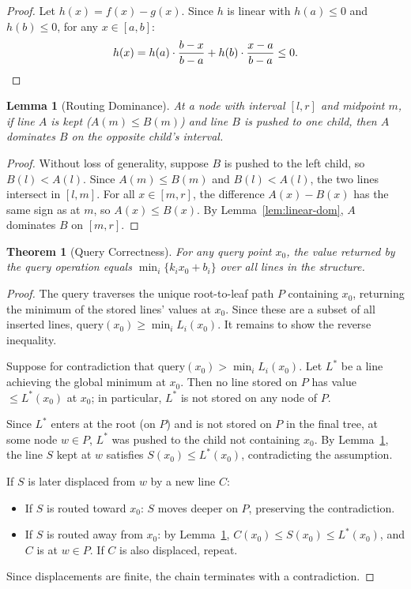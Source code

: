 \documentclass[11pt,a4paper]{article}
\theoremstyle{definition}
\theoremstyle{plain}
\newtheorem{lemma}{Lemma}
\newtheorem{theorem}{Theorem}
\begin{document}
\begin{proof}
Let $h(x) = f(x) - g(x)$. Since $h$ is linear with $h(a) \leq 0$ and $h(b) \leq 0$, for any $x \in [a, b]$:
\[
h(x) = h(a) \cdot \frac{b - x}{b - a} + h(b) \cdot \frac{x - a}{b - a} \leq 0. \qedhere
\]
\end{proof}

\begin{lemma}[Routing Dominance]\label{lem:routing-dom}
At a node with interval $[l, r]$ and midpoint $m$, if line $A$ is kept ($A(m) \leq B(m)$) and line $B$ is pushed to one child, then $A$ dominates $B$ on the opposite child's interval.
\end{lemma}

\begin{proof}
Without loss of generality, suppose $B$ is pushed to the left child, so $B(l) < A(l)$. Since $A(m) \leq B(m)$ and $B(l) < A(l)$, the two lines intersect in $[l, m]$. For all $x \in [m, r]$, the difference $A(x) - B(x)$ has the same sign as at $m$, so $A(x) \leq B(x)$. By Lemma~\ref{lem:linear-dom}, $A$ dominates $B$ on $[m, r]$.
\end{proof}

\begin{theorem}[Query Correctness]\label{thm:query-correct}
For any query point $x_0$, the value returned by the query operation equals $\min_{i} \{k_i x_0 + b_i\}$ over all lines in the structure.
\end{theorem}

\begin{proof}
The query traverses the unique root-to-leaf path $P$ containing $x_0$, returning the minimum of the stored lines' values at $x_0$. Since these are a subset of all inserted lines, $\text{query}(x_0) \geq \min_i L_i(x_0)$. It remains to show the reverse inequality.

Suppose for contradiction that $\text{query}(x_0) > \min_i L_i(x_0)$. Let $L^*$ be a line achieving the global minimum at $x_0$. Then no line stored on $P$ has value $\leq L^*(x_0)$ at $x_0$; in particular, $L^*$ is not stored on any node of $P$.

Since $L^*$ enters at the root (on $P$) and is not stored on $P$ in the final tree, at some node $w \in P$, $L^*$ was pushed to the child not containing $x_0$. By Lemma~\ref{lem:routing-dom}, the line $S$ kept at $w$ satisfies $S(x_0) \leq L^*(x_0)$, contradicting the assumption.

If $S$ is later displaced from $w$ by a new line $C$:
\begin{itemize}
\item If $S$ is routed toward $x_0$: $S$ moves deeper on $P$, preserving the contradiction.
\item If $S$ is routed away from $x_0$: by Lemma~\ref{lem:routing-dom}, $C(x_0) \leq S(x_0) \leq L^*(x_0)$, and $C$ is at $w \in P$. If $C$ is also displaced, repeat.
\end{itemize}
Since displacements are finite, the chain terminates with a contradiction.
\end{proof}
\end{document}
